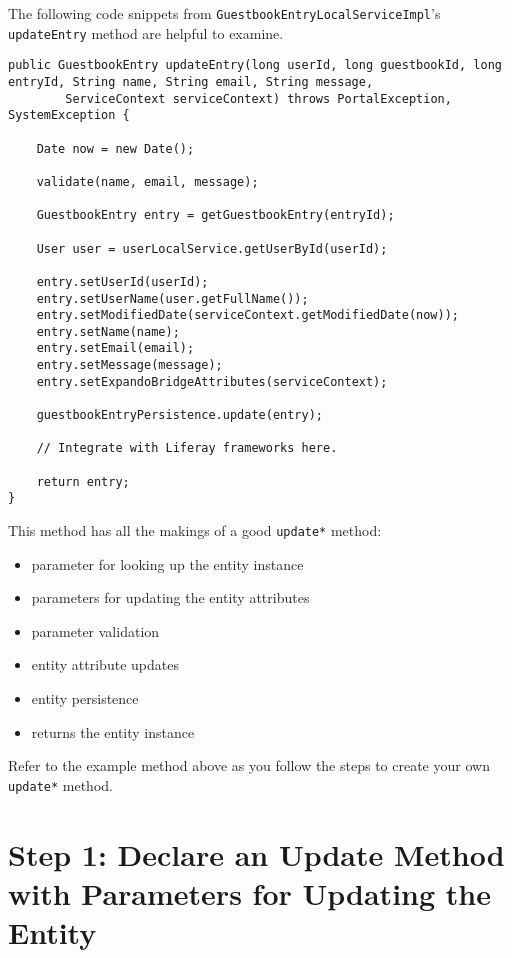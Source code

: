 The following code snippets from
\texttt{GuestbookEntryLocalServiceImpl}'s \texttt{updateEntry} method
are helpful to examine.

\begin{verbatim}
public GuestbookEntry updateEntry(long userId, long guestbookId, long entryId, String name, String email, String message,
        ServiceContext serviceContext) throws PortalException, SystemException {

    Date now = new Date();

    validate(name, email, message);

    GuestbookEntry entry = getGuestbookEntry(entryId);

    User user = userLocalService.getUserById(userId);

    entry.setUserId(userId);
    entry.setUserName(user.getFullName());
    entry.setModifiedDate(serviceContext.getModifiedDate(now));
    entry.setName(name);
    entry.setEmail(email);
    entry.setMessage(message);
    entry.setExpandoBridgeAttributes(serviceContext);

    guestbookEntryPersistence.update(entry);

    // Integrate with Liferay frameworks here.

    return entry;
}
\end{verbatim}

This method has all the makings of a good \texttt{update*} method:

\begin{itemize}
\tightlist
\item
  parameter for looking up the entity instance
\item
  parameters for updating the entity attributes
\item
  parameter validation
\item
  entity attribute updates
\item
  entity persistence
\item
  returns the entity instance
\end{itemize}

Refer to the example method above as you follow the steps to create your
own \texttt{update*} method.

\section{Step 1: Declare an Update Method with Parameters for Updating
the
Entity}\label{step-1-declare-an-update-method-with-parameters-for-updating-the-entity}

